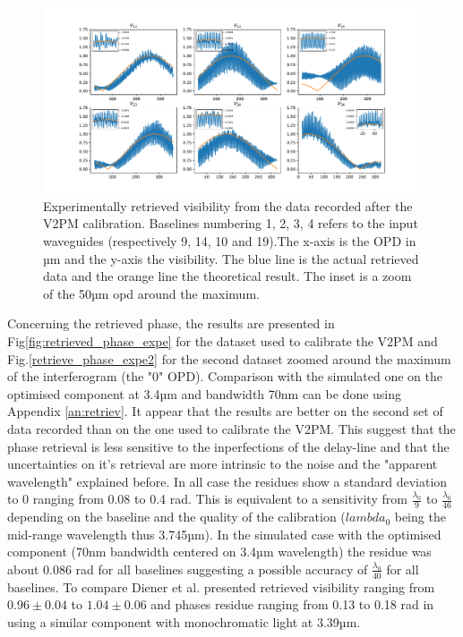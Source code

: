 \begin{figure}[htbp!]
 \centering
 \includegraphics[scale=.4]{../picture/retrieve_visi_expe2.pdf}
 \caption{Experimentally retrieved visibility from the data recorded after the V2PM calibration. Baselines numbering 1, 2, 3, 4 refers to the input waveguides (respectively  9, 14, 10 and 19).The x-axis is the OPD in µm and the y-axis the visibility. The blue line is the actual retrieved data and the orange line the theoretical result. The inset is a zoom of the 50µm opd around the maximum. }
 \label{fig:retrieved_visi_expe2}
\end{figure}

Concerning the retrieved phase, the results are presented in Fig\ref{fig:retrieved_phase_expe} for the dataset used to calibrate the V2PM and Fig.\ref{retrieve_phase_expe2} for the second dataset zoomed around the maximum of the interferogram (the "0" OPD). Comparison with the simulated one on the optimised component at 3.4µm and bandwidth 70nm can be done using Appendix \ref{an:retriev}. It appear that the results are better on the second set of data recorded than on the one used to calibrate the V2PM. This suggest that the phase retrieval is less sensitive to the inperfections of the delay-line and that the uncertainties on it's retrieval are more intrinsic to the noise and the "apparent wavelength" explained before. In all case the residues show a standard deviation to 0 ranging from 0.08 to 0.4 rad. This is equivalent to a sensitivity from $\frac{\lambda_0}{9}$ to $\frac{\lambda_0}{46}$ depending on the baseline and the quality of the calibration ($lambda_0$ being the mid-range wavelength thus 3.745µm). In the simulated case with the optimised component (70nm bandwidth centered on 3.4µm wavelength) the residue was about 0.086 rad for all baselines suggesting a possible accuracy of $\frac{\lambda_0}{40}$ for all baselines. To compare Diener et al. presented retrieved visibility ranging from $0.96\pm0.04$ to $1.04\pm0.06$ and phases residue ranging from 0.13 to 0.18 rad in\cite{Diener2017} using a similar component with monochromatic light at 3.39µm.  

